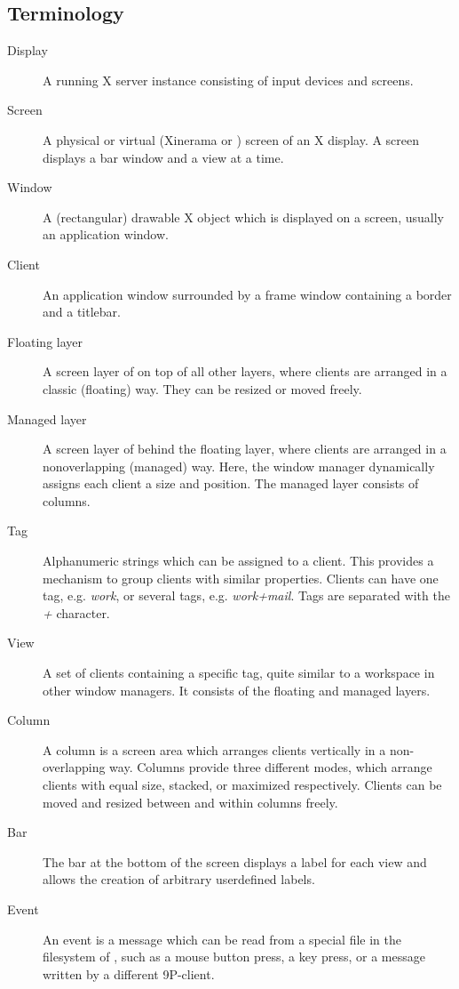 \subsection{Terminology}

\begin{description}
\item[Display] A running X server instance consisting of input
	devices and screens.
\item[Screen] A physical or virtual (Xinerama or )
	screen of an X display. A screen displays a bar window
	and a view at a time.
\item[Window] A (rectangular) drawable X object which is
	displayed on a screen, usually an application window.
\item[Client] An application window surrounded by a frame window
	containing a border and a titlebar.
\item[Floating layer] A screen layer of  on top of
	all other layers, where clients are arranged in a
	classic (floating) way.  They can be resized or moved
	freely.
\item[Managed layer] A screen layer of  behind the
	floating layer, where clients are arranged in a
	non\-overlapping (managed) way.  Here, the window
	manager dynamically assigns each client a size and
	position.  The managed layer consists of columns.
\item[Tag] Alphanumeric strings which can be assigned to a
	client. This provides a mechanism to group clients with
	similar properties. Clients can have one tag, e.g.
	\emph{work}, or several tags, e.g.  \emph{work+mail}.
	Tags are separated with the \emph{+} character.
\item[View] A set of clients containing a specific tag, quite
	similar to a workspace in other window managers.  It
	consists of the floating and managed layers.
\item[Column] A column is a screen area which arranges clients
	vertically in a non-overlapping way. Columns provide
	three different modes, which arrange clients with equal
	size, stacked, or maximized respectively.  Clients can
	be moved and resized between and within columns freely.
\item[Bar] The bar at the bottom of the screen displays a label
	for each view and allows the creation of arbitrary
	user\-defined labels.
\item[Event] An event is a message which can be read from a
	special file in the filesystem of , such as a
	mouse button press, a key press, or a message written by
	a different 9P-client.
\end{description}

